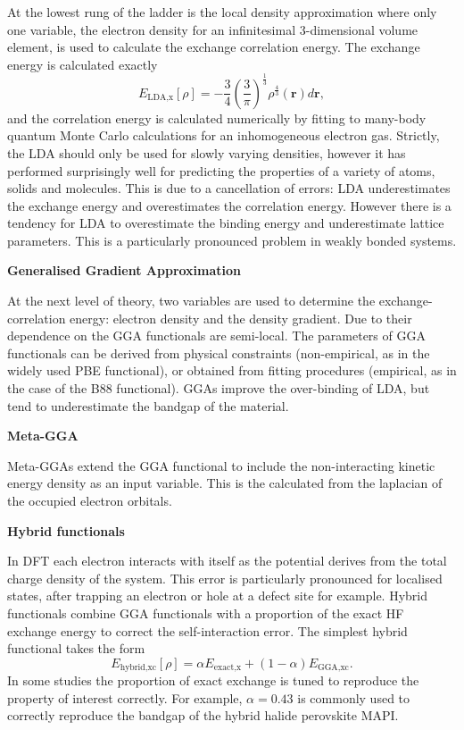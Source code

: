 At the lowest rung of the ladder is the local density approximation where only one variable, the electron density for an infinitesimal 3-dimensional volume element, is used to calculate the exchange correlation energy. The exchange energy is calculated exactly
\begin{equation}
E_{\textrm{LDA,x}}\left[\rho\right] = {-\frac{3}{4}\left(\frac{3}{\pi}\right)^{\frac{1}{3}}\rho^{\frac{4}{3}}\left(\textbf{r}\right)d\textbf{r}},
\end{equation}
and the correlation energy is calculated numerically by fitting to many-body quantum Monte Carlo calculations for an inhomogeneous electron gas. %
Strictly, the LDA should only be used for slowly varying densities, however it has performed surprisingly well for predicting the properties of a variety of atoms, solids and molecules. This is due to a cancellation of errors: LDA underestimates the exchange energy and overestimates the correlation energy. However there is a tendency for LDA to overestimate the binding energy and underestimate lattice parameters. This is a particularly pronounced problem in weakly bonded systems.


\textbf{Generalised Gradient Approximation}

At the next level of theory, two variables are used to determine the exchange-correlation energy: electron density and the density gradient. Due to their dependence on the GGA functionals are semi-local. The parameters of GGA functionals can be derived from physical constraints (non-empirical, as in the widely used PBE functional), or obtained from fitting procedures (empirical, as in the case of the B88 functional). GGAs improve the over-binding of LDA, but tend to underestimate the bandgap of the material.


\textbf{Meta-GGA} 

Meta-GGAs extend the GGA functional to include the non-interacting kinetic energy density as an input variable. This is the calculated from the laplacian of the occupied electron orbitals.


\textbf{Hybrid functionals} 

In DFT each electron interacts with itself as the potential derives from the total charge density of the system. This error is particularly pronounced for localised states, after trapping an electron or hole at a defect site for example. Hybrid functionals combine GGA functionals with a proportion of the exact HF exchange energy to correct the self-interaction error. The simplest hybrid functional takes the form
\begin{equation}
E_{\textrm{hybrid,xc}}\left[\rho\right] = \alpha E_{\textrm{exact,x}} + \left(1-\alpha\right)E_{\textrm{GGA,xc}}.
\end{equation}
In some studies the proportion of exact exchange is tuned to reproduce the property of interest correctly. For example, $\alpha=0.43$ is commonly used to correctly reproduce the bandgap of the hybrid halide perovskite MAPI. %

